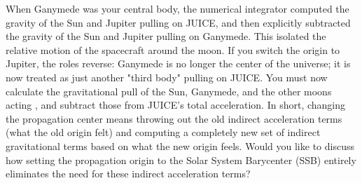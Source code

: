 {}
\markdownRendererSectionEnd \markdownRendererSectionBegin
{}\markdownRendererInterblockSeparator
{}When Ganymede was your central body, the numerical integrator computed the gravity of the Sun and Jupiter pulling on JUICE, and then explicitly subtracted the gravity of the Sun and Jupiter pulling on Ganymede. This isolated the relative motion of the spacecraft around the moon.\markdownRendererInterblockSeparator
{}If you switch the origin to Jupiter, the roles reverse:\markdownRendererInterblockSeparator
{}\markdownRendererUlBegin
\markdownRendererUlItem Ganymede is no longer the center of the universe; it is now treated as just another "third body" pulling on JUICE.\markdownRendererUlItemEnd 
\markdownRendererUlItem You must now calculate the gravitational pull of the Sun, Ganymede, and the other moons acting , and subtract those from JUICE's total acceleration.\markdownRendererUlItemEnd 
\markdownRendererUlEnd \markdownRendererInterblockSeparator
{}In short, changing the propagation center means throwing out the old indirect acceleration terms (what the old origin felt) and computing a completely new set of indirect gravitational terms based on what the new origin feels.\markdownRendererInterblockSeparator
{}\markdownRendererThematicBreak{}\markdownRendererInterblockSeparator
{}Would you like to discuss how setting the propagation origin to the Solar System Barycenter (SSB) entirely eliminates the need for these indirect acceleration terms?\markdownRendererInterblockSeparator
{}\markdownRendererThematicBreak{}\markdownRendererInterblockSeparator
{}
\markdownRendererSectionEnd 
\markdownRendererSectionEnd \markdownRendererSectionBegin
{}\markdownRendererInterblockSeparator
